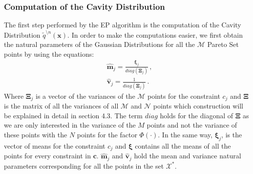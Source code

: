 \subsubsection{Computation of the Cavity Distribution}

The first step performed by the EP algorithm is the computation of the Cavity Distribution $\tilde{q}^{\setminus n}(\boldsymbol{x})$. In order to make the computations easier, we first obtain the natural parameters of the Gaussian Distributions for all the $\mathcal{M}$ Pareto Set points by using the equations:
\begin{align}
& \boldsymbol{\hat{m}}_{j} = \frac{\boldsymbol{\xi}_j}{diag(\boldsymbol{\Xi}_j)}\,, \nonumber \\
& \boldsymbol{\hat{v}}_{j} = \frac{1}{diag(\boldsymbol{\Xi}_j)}\,.
\end{align}
Where $\boldsymbol{\Xi}_j$ is a vector of the variances of the $\mathcal{M}$ points for the constraint $c_j$ and $\boldsymbol{\Xi}$ is the matrix of all the variances of all $\mathcal{M}$ and $\mathcal{N}$ points which construction will be explained in detail in section 4.3. The term $diag$ holds for the diagonal of $\boldsymbol{\Xi}$ as we are only interested in the variance of the $M$ points and not the variance of these points with the $N$ points for the factor $\Phi(\cdot)$. In the same way, $\boldsymbol{\xi}_j$, is the vector of means for the constraint $c_j$ and $\boldsymbol{\xi}$ contains all the means of all the points for every constraint in $\boldsymbol{c}$. $\boldsymbol{\hat{m}}_{j}$ and $\boldsymbol{\hat{v}}_{j}$ hold the mean and variance natural parameters corresponding for all the points in the set $\mathcal{X}^*$.

